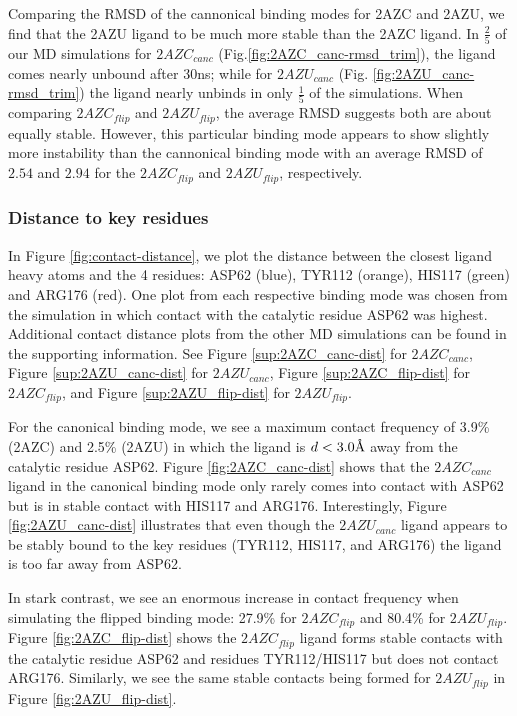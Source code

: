 \documentclass[fleqn,10pt]{wlscirep}
\newcommand{\angstrom}{\text{\normalfont\AA}}
\begin{document}
Comparing the RMSD of the cannonical binding modes for 2AZC and 2AZU, we find that the 2AZU ligand to be much more stable than the 2AZC ligand.
In $\frac{2}{5}$ of our MD simulations for $2AZC_{canc}$ (Fig.\ref{fig:2AZC_canc-rmsd_trim}), the ligand comes nearly unbound after 30ns; while for $2AZU_{canc}$ (Fig. \ref{fig:2AZU_canc-rmsd_trim}) the ligand nearly unbinds in only $\frac{1}{5}$ of the simulations.
When comparing $2AZC_{flip}$ and $2AZU_{flip}$, the average RMSD suggests both are about equally stable.
However, this particular binding mode appears to show slightly more instability than the cannonical binding mode with an average RMSD of $2.54$ and $2.94$ for the $2AZC_{flip}$ and $2AZU_{flip}$, respectively.

\subsubsection{Distance to key residues}

In Figure \ref{fig:contact-distance}, we plot the distance between the closest ligand heavy atoms and the 4 residues: ASP62 (blue), TYR112 (orange), HIS117 (green) and ARG176 (red).
One plot from each respective binding mode was chosen from the simulation in which contact with the catalytic residue ASP62 was highest.
Additional contact distance plots from the other MD simulations can be found in the supporting information.
See Figure \ref{sup:2AZC_canc-dist} for $2AZC_{canc}$, Figure \ref{sup:2AZU_canc-dist} for $2AZU_{canc}$, Figure \ref{sup:2AZC_flip-dist} for $2AZC_{flip}$, and Figure \ref{sup:2AZU_flip-dist} for $2AZU_{flip}$.

For the canonical binding mode, we see a maximum contact frequency of 3.9\% (2AZC) and 2.5\% (2AZU) in which the ligand is $d<3.0\angstrom$ away from the catalytic residue ASP62.
Figure \ref{fig:2AZC_canc-dist} shows that the $2AZC_{canc}$ ligand in the canonical binding mode only rarely comes into contact with ASP62 but is in stable contact with HIS117 and ARG176.  
Interestingly, Figure \ref{fig:2AZU_canc-dist} illustrates that even though the $2AZU_{canc}$ ligand appears to be stably bound to the key residues (TYR112, HIS117, and ARG176) the ligand is too far away from ASP62.

In stark contrast, we see an enormous increase in contact frequency when simulating the flipped binding mode: 27.9\% for $2AZC_{flip}$ and 80.4\% for $2AZU_{flip}$.
Figure \ref{fig:2AZC_flip-dist} shows the $2AZC_{flip}$ ligand forms stable contacts with the catalytic residue ASP62 and residues TYR112/HIS117 but does not contact ARG176.
Similarly, we see the same stable contacts being formed for $2AZU_{flip}$ in Figure \ref{fig:2AZU_flip-dist}.
\end{document}
